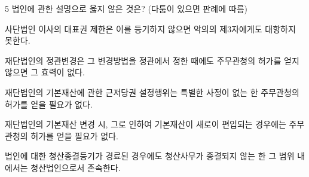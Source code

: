 \begin{question}{5}
법인에 관한 설명으로 옳지 않은 것은? (다툼이 있으면 판례에 따름)
\begin{choices}
  \item 사단법인 이사의 대표권 제한은 이를 등기하지 않으면 악의의 제3자에게도 대항하지 못한다.
  \item 재단법인의 정관변경은 그 변경방법을 정관에서 정한 때에도 주무관청의 허가를 얻지 않으면 그 효력이 없다.
  \item 재단법인의 기본재산에 관한 근저당권 설정행위는 특별한 사정이 없는 한 주무관청의 허가를 얻을 필요가 없다.
  \item 재단법인의 기본재산 변경 시, 그로 인하여 기본재산이 새로이 편입되는 경우에는 주무관청의 허가를 얻을 필요가 없다.
  \item 법인에 대한 청산종결등기가 경료된 경우에도 청산사무가 종결되지 않는 한 그 범위 내에서는 청산법인으로서 존속한다.
\end{choices}
\end{question}
